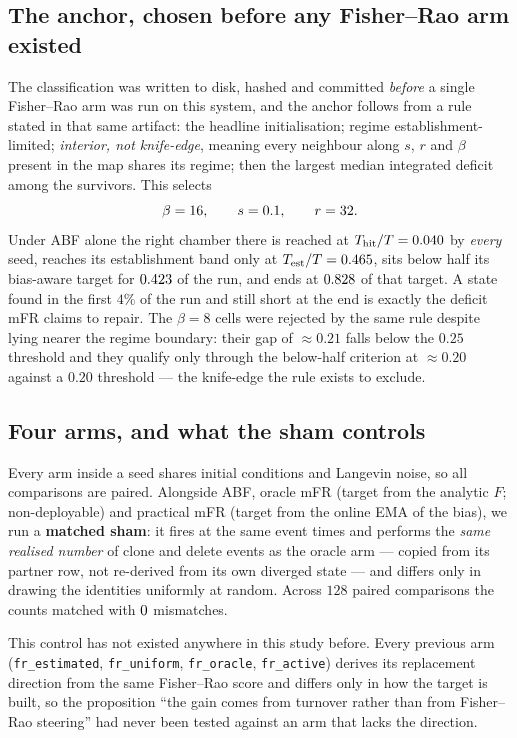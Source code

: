 \subsection{The anchor, chosen before any Fisher--Rao arm existed}
The classification was written to disk, hashed and committed \emph{before} a single
Fisher--Rao arm was run on this system, and the anchor follows from a rule stated in that
same artifact: the headline initialisation; regime establishment-limited; \emph{interior,
not knife-edge}, meaning every neighbour along $s$, $r$ and $\beta$ present in the map shares
its regime; then the largest median integrated deficit among the survivors. This selects
\begin{equation*}
  \beta = 16, \qquad s = 0.1, \qquad r = 32 .
\end{equation*}
Under ABF alone the right chamber there is reached at $T_{\mathrm{hit}}/T = 0.040$ by
\emph{every} seed, reaches its establishment band only at
$T_{\mathrm{est}}/T = 0.465$, sits below half its bias-aware target for
$0.423$ of the run, and ends at $0.828$ of that target. A state
found in the first $4\%$ of the run and still short at the end is exactly the deficit mFR
claims to repair. The $\beta=8$ cells were rejected by the same rule despite lying nearer the
regime boundary: their gap of $\approx0.21$ falls below the $0.25$ threshold and they qualify
only through the below-half criterion at $\approx0.20$ against a $0.20$ threshold --- the
knife-edge the rule exists to exclude.

\subsection{Four arms, and what the sham controls}
\label{sec:gw_sham}
Every arm inside a seed shares initial conditions and Langevin noise, so all comparisons are
paired. Alongside ABF, oracle mFR (target from the analytic $F$; non-deployable) and
practical mFR (target from the online EMA of the bias), we run a \textbf{matched sham}: it
fires at the same event times and performs the \emph{same realised number} of clone and
delete events as the oracle arm --- copied from its partner row, not re-derived from its own
diverged state --- and differs only in drawing the identities uniformly at random. Across
$128$ paired comparisons the counts matched with $0$ mismatches.

This control has not existed anywhere in this study before. Every previous arm
(\texttt{fr\_estimated}, \texttt{fr\_uniform}, \texttt{fr\_oracle}, \texttt{fr\_active})
derives its replacement direction from the same Fisher--Rao score and differs only in how the
target is built, so the proposition ``the gain comes from turnover rather than
from Fisher--Rao steering'' had never been tested against an arm that lacks the direction.

